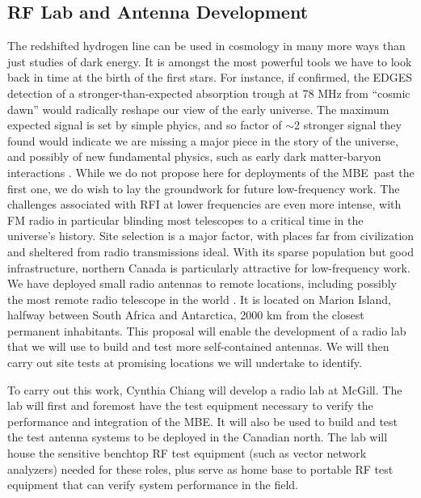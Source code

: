 \documentclass[letterpaper,11pt,preprint]{aastex}
\newcommand{\mbe}{{\rm MBE}}
\begin{document}
\subsection{RF Lab and Antenna Development}
The redshifted hydrogen line can be used in cosmology in many more
ways than just studies of dark energy.  It is amongst the most
powerful tools we have to look back in time at the birth of the first
stars.  For instance, if confirmed, the EDGES detection of a
stronger-than-expected absorption trough at 78 MHz from ``cosmic
dawn''\citep{Bowman2018} would radically reshape our view of the early
universe.  The maximum expected signal is set by simple phyics, and so
factor of $\sim$2 stronger signal they found would indicate we are
missing a major piece in the story of the universe, and possibly of
new fundamental physics, such as early dark matter-baryon interactions
\citep{Barkana2018}.  While we do not propose here for deployments of
the \mbe\ past the first one, we do wish to lay the groundwork for
future low-frequency work.  The challenges associated with RFI at
lower frequencies are even more intense, with FM radio in particular
blinding most telescopes to a critical time in the universe's history.
Site selection is a major factor, with places far from civilization
and sheltered from radio transmissions ideal.  With its sparse
population but good infrastructure, northern Canada is particularly
attractive for low-frequency work.  We have deployed small radio
antennas to remote locations, including possibly the most remote radio
telescope in the world \citep{PRIZM}.  It is located on Marion Island,
halfway between South Africa and Antarctica, 2000 km from the closest
permanent inhabitants.  This proposal will enable the development of a
radio lab that we will use to build and test more self-contained
antennas.  We will then carry out site tests at promising locations we
will undertake to identify.

To carry out this work, Cynthia Chiang will develop a radio lab at
McGill.  The lab will first and foremost have the test equipment
necessary to verify the performance and integration of the \mbe.  It
will also be used to build and test the test antenna systems to be
deployed in the Canadian north.  The lab will house the sensitive
benchtop RF test equipment (such as vector network analyzers) needed
for these roles, plus serve as home base to portable RF test equipment
that can verify system performance in the field.  
\end{document}
